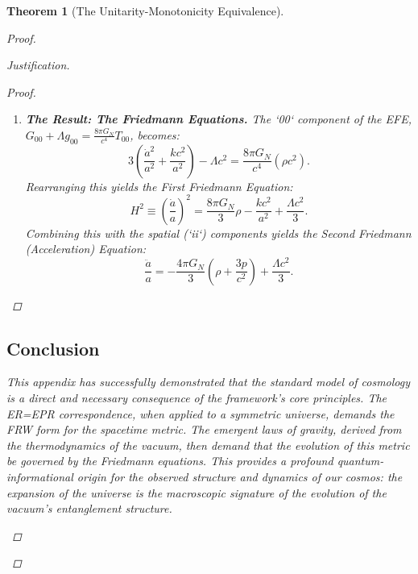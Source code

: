 \documentclass[11pt, letterpaper]{report}
\theoremstyle{plain} %
\newtheorem{theorem}{Theorem}[chapter]
\theoremstyle{definition} %
\theoremstyle{remark} %
\begin{document}
\begin{theorem}[The Unitarity-Monotonicity Equivalence]
\begin{proof}
\begin{proof}[Justification]
\begin{proof}
\begin{enumerate}
    \item \textbf{The Result: The Friedmann Equations.}
    The `00` component of the EFE, $G_{00} + \Lambda g_{00} = \frac{8\pi G_N}{c^4}T_{00}$, becomes:
    \begin{equation}
        3\left( \frac{\dot{a}^2}{a^2} + \frac{kc^2}{a^2} \right) - \Lambda c^2 = \frac{8\pi G_N}{c^4} (\rho c^2).
    \end{equation}
    Rearranging this yields the First Friedmann Equation:
    \begin{equation}
        \boxed{H^2 \equiv \left(\frac{\dot{a}}{a}\right)^2 = \frac{8\pi G_N}{3}\rho - \frac{kc^2}{a^2} + \frac{\Lambda c^2}{3}.}
    \end{equation}
    Combining this with the spatial (`ii`) components yields the Second Friedmann (Acceleration) Equation:
    \begin{equation}
        \boxed{\frac{\ddot{a}}{a} = -\frac{4\pi G_N}{3}\left(\rho + \frac{3p}{c^2}\right) + \frac{\Lambda c^2}{3}.}
    \end{equation}
\end{enumerate}
\end{proof}

\subsection{Conclusion}

This appendix has successfully demonstrated that the standard model of cosmology is a direct and necessary consequence of the framework's core principles. The ER=EPR correspondence, when applied to a symmetric universe, demands the FRW form for the spacetime metric. The emergent laws of gravity, derived from the thermodynamics of the vacuum, then demand that the evolution of this metric be governed by the Friedmann equations. This provides a profound quantum-informational origin for the observed structure and dynamics of our cosmos: the expansion of the universe is the macroscopic signature of the evolution of the vacuum's entanglement structure.


\begin{thebibliography}{99} %


\end{thebibliography}
\end{proof}
\end{proof}
\end{theorem}
\end{document}
